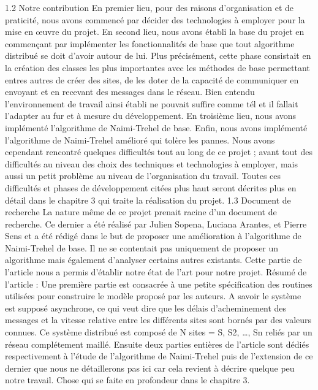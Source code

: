 \documentclass[a4paper,french,towsides,10pt]{book}
\begin{document}
1.2 Notre contribution
En premier lieu, pour des raisons d’organisation et de praticité, nous avons commencé par décider des technologies à employer pour la mise en œuvre du projet.
En second lieu, nous avons établi la base du projet en commençant par implémenter les fonctionnalités de base que tout algorithme distribué se doit d’avoir autour de lui.
Plus précisément, cette phase consistait en la création des classes les plus importantes avec les méthodes de base permettant entres autres de créer des sites, de les doter de la capacité de communiquer en envoyant et en recevant des messages dans le réseau. Bien entendu l’environnement de travail ainsi établi ne pouvait suffire comme tél et il fallait l’adapter au fur et à mesure du développement.
En troisième lieu, nous avons implémenté l’algorithme de Naimi-Trehel de base.
Enfin, nous avons implémenté l’algorithme de Naimi-Trehel amélioré qui tolère les pannes.
Nous avons cependant rencontré quelques difficultés tout au long de ce projet ; avant tout des difficultés au niveau des choix des techniques et technologies à employer, mais aussi un petit problème au niveau de l’organisation du travail.
Toutes ces difficultés et phases de développement citées plus haut seront décrites plus en détail dans le chapitre 3 qui traite la réalisation du projet.
1.3 Document de recherche
La nature même de ce projet prenait racine d’un document de recherche.
Ce dernier a été réalisé par Julien Sopena, Luciana Arantes, et Pierre Sens et a été rédigé dans le but de proposer une amélioration à l’algorithme de Naimi-Trehel de base. Il ne se contentait pas uniquement de proposer un algorithme mais également d’analyser certains autres existants.
Cette partie de l’article nous a permis d’établir notre état de l’art pour notre projet.
Résumé de l’article :
Une première partie est consacrée à une petite spécification des routines utilisées pour construire le modèle proposé par les auteurs. A savoir le système est supposé asynchrone, ce qui veut dire que les délais d'acheminement des messages et la vitesse relative entre les différents sites sont bornés par des valeurs connues. Ce système distribué est composé de N sites = {S, S2, …, Sn} reliés par un réseau complétement maillé.
Ensuite deux parties entières de l’article sont dédiés respectivement à l’étude de l’algorithme de Naimi-Trehel puis de l’extension de ce dernier que nous ne détaillerons pas ici car cela revient à décrire quelque peu notre travail. Chose qui se faite en profondeur dans le chapitre 3.
\end{document}
